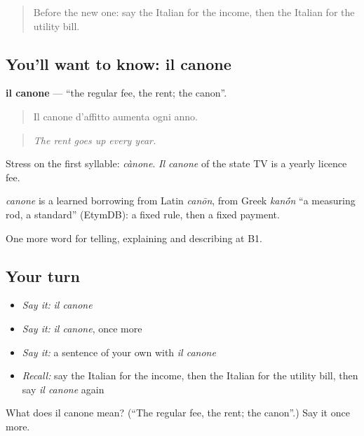 \begin{quote}
Before the new one: say the Italian for the income, then the Italian for the utility bill.
\end{quote}

\subsection*{You'll want to know: il canone}
\textbf{il canone} — \textquotedblleft{}the regular fee, the rent; the canon\textquotedblright{}.

\begin{quote}
Il canone d'affitto aumenta ogni anno.
\end{quote}

\begin{quote}
\emph{The rent goes up every year.}
\end{quote}

Stress on the first syllable: \emph{cànone}. \emph{Il canone} of the state TV is a yearly licence fee.

\begin{cousinweb}
\emph{canone} is a learned borrowing from Latin \emph{canōn}, from Greek \emph{kan\'{\={o}}n} \textquotedblleft{}a measuring rod, a standard\textquotedblright{} (EtymDB): a fixed rule, then a fixed payment.
\end{cousinweb}

\begin{grammarlens}[title={What you've built}]
One more word for telling, explaining and describing at B1.
\end{grammarlens}

\subsection*{Your turn}
\begin{itemize}
\raggedright
  \item \emph{Say it:} \emph{il canone}
  \item \emph{Say it:} \emph{il canone}, once more
  \item \emph{Say it:} a sentence of your own with \emph{il canone}
  \item \emph{Recall:} say the Italian for the income, then the Italian for the utility bill, then say \emph{il canone} again
\end{itemize}

\begin{tcolorbox}[breakable,colback=teal!4,colframe=teal!35!black,title={Before you move on}]
What does il canone mean? (\textquotedblleft{}The regular fee, the rent; the canon\textquotedblright{}.) Say it once more.
\end{tcolorbox}
